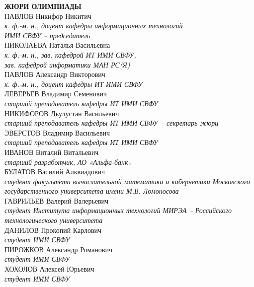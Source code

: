 \noindent
\textbf{ЖЮРИ ОЛИМПИАДЫ}
\\[2mm]
ПАВЛОВ Никифор Никитич \\
\textit{к. ф.-м. н., доцент кафедры информационных технологий\\ ИМИ СВФУ -- председатель}
\\[2mm]
НИКОЛАЕВА Наталья Васильевна \\
\textit{к. ф.-м. н., зав. кафедрой ИТ ИМИ СВФУ,\\
зав. кафедрой информатики МАН РС(Я)}
\\[2mm]
ПАВЛОВ Александр Викторович \\
\textit{к. ф.-м. н., доцент кафедры ИТ ИМИ СВФУ}
\\[2mm]
ЛЕВЕРЬЕВ Владимир Семенович \\
\textit{старший преподаватель кафедры ИТ ИМИ СВФУ}
\\[2mm]
НИКИФОРОВ Дьулустан Васильевич \\
\textit{старший преподаватель кафедры ИТ ИМИ СВФУ
-- секретарь жюри}
\\[2mm]
ЭВЕРСТОВ Владимир Васильевич \\
\textit{старший преподаватель кафедры ИТ ИМИ СВФУ}
\\[2mm]
ИВАНОВ Виталий Витальевич\\
\textit{старший разработчик, АО «Альфа-банк»}
\\[2mm]
БУЛАТОВ Василий Алквиадович\\
\textit{студент факультета вычислительной математики и кибернетики Московского государственного университета имени М.В. Ломоносова}
\\[2mm]
ГАВРИЛЬЕВ Валерий Валерьевич\\
\textit{студент Института информационных технологий МИРЭА – Российского технологического университета}
\\[2mm]
ДАНИЛОВ Прокопий Карлович\\
\textit{студент ИМИ СВФУ}
\\[2mm]
ПИРОЖКОВ Александр Романович\\
\textit{студент ИМИ СВФУ}
\\[2mm]
ХОХОЛОВ Алексей Юрьевич\\
\textit{студент ИМИ СВФУ}

